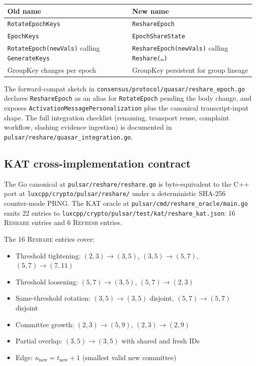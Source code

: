\begin{center}
\begin{tabular}{ll}
\textbf{Old name} & \textbf{New name} \\ \hline
\texttt{RotateEpochKeys} & \texttt{ReshareEpoch} \\
\texttt{EpochKeys} & \texttt{EpochShareState} \\
\texttt{RotateEpoch(newVals)} calling \texttt{GenerateKeys} & \texttt{ReshareEpoch(newVals)} calling \texttt{Reshare(\ldots)} \\
GroupKey changes per epoch & GroupKey persistent for group lineage \\
\end{tabular}
\end{center}

\noindent
The forward-compat sketch in \texttt{consensus/protocol/quasar/reshare\_epoch.go} declares \texttt{ReshareEpoch} as an alias for \texttt{RotateEpoch} pending the body change, and exposes \texttt{ActivationMessage\-Personalization} plus the canonical transcript-input shape. The full integration checklist (renaming, transport reuse, complaint workflow, slashing evidence ingestion) is documented in \texttt{pulsar/reshare/quasar\_integration.go}.

\subsection{KAT cross-implementation contract}
\label{sec:resharing-kat}

The Go canonical at \texttt{pulsar/reshare/reshare.go} is byte-equivalent to the C++ port at \texttt{luxcpp/crypto/pulsar/reshare/} under a deterministic SHA-256 counter-mode PRNG. The KAT oracle at \texttt{pulsar/cmd/reshare\_oracle/main.go} emits 22 entries to \texttt{luxcpp/crypto/pulsar/test/kat/reshare\_kat.json}: 16 \textsc{Reshare} entries and 6 \textsc{Refresh} entries.

The 16 \textsc{Reshare} entries cover:
\begin{itemize}
\item Threshold tightening: $(2, 3) \to (3, 5)$, $(3, 5) \to (5, 7)$, $(5, 7) \to (7, 11)$
\item Threshold loosening: $(5, 7) \to (3, 5)$, $(5, 7) \to (2, 3)$
\item Same-threshold rotation: $(3, 5) \to (3, 5)$ disjoint, $(5, 7) \to (5, 7)$ disjoint
\item Committee growth: $(2, 3) \to (5, 9)$, $(2, 3) \to (2, 9)$
\item Partial overlap: $(3, 5) \to (3, 5)$ with shared and fresh IDs
\item Edge: $n_{\mathrm{new}} = t_{\mathrm{new}} + 1$ (smallest valid new committee)
\end{itemize}

